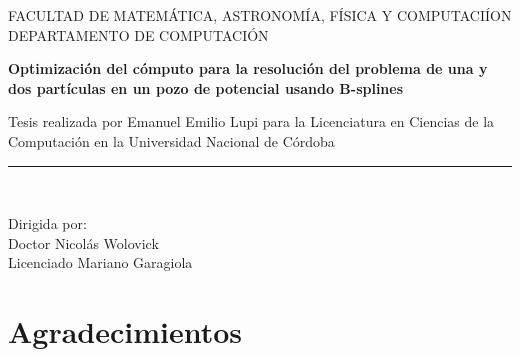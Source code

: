 \documentclass[a4paper,openright,12pt, oneside]{book}
\begin{document}
\begin{titlepage}

\begin{center}
\vspace*{-1in}


FACULTAD DE MATEM\'ATICA, ASTRONOM\'IA, F\'ISICA Y COMPUTACI\'ION\\
\vspace*{0.15in}
DEPARTAMENTO DE COMPUTACI\'ON \\
\vspace*{0.6in}
\begin{large}
\end{large}
\vspace*{0.2in}
\begin{Large}
\textbf{Optimizaci\'on del c\'omputo para la resoluci\'on del problema de una y dos part\'iculas en un pozo de potencial usando B-splines} \\
\end{Large}
\vspace*{0.3in}
\begin{large}
Tesis realizada por Emanuel Emilio Lupi para la Licenciatura en Ciencias de la Computaci\'on en la Universidad Nacional de C\'ordoba\end{large}

\vspace*{0.3in}
\rule{80mm}{0.1mm}\\
\vspace*{0.1in}
\begin{large}
Dirigida por: \\
Doctor Nicol\'as Wolovick\\
Licenciado Mariano Garagiola\\
\vspace*{0.1in}
\end{large}
\end{center}
\end{titlepage}

\mbox{}
\thispagestyle{empty}

\chapter*{Agradecimientos} %
\end{document}
